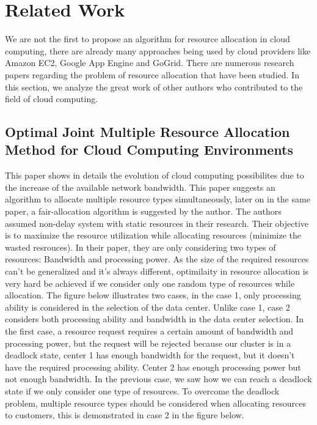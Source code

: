 \documentclass{article}
\begin{document}
\newpage
\section{Related Work}
We are not the ﬁrst to propose an algorithm for resource allocation in cloud computing, there are already many approaches being used by cloud providers like Amazon EC2, Google App Engine and GoGrid. There are numerous research papers regarding the problem of resource allocation that have been studied. In this section, we analyze the great work of other authors who contributed to the field of cloud computing.

\subsection{Optimal Joint Multiple Resource Allocation Method for Cloud Computing Environments}
This paper shows in details the evolution of cloud computing possibilites due to the increase of the available network bandwidth. This paper suggests an algorithm to allocate multiple resource types simultaneously, later on in the same paper, a fair-allocation algorithm is suggested by the author. The authors assumed non-delay system with static resources in their research. Their objective is to maximize the resource utilization while allocating resources (minimize the wasted resrouces). In their paper, they are only considering two types of resources: Bandwidth and processing power. As the size of the required resources can't be generalized and it's always different, optimilaity in resource allocation is very hard be achieved if we consider only one random type of resources while allocation. The figure below illustrates two cases, in the case 1, only processing ability is considered in the selection of the data center. Unlike case 1, case 2 considers both processing ability and bandwidth in the data center selection. In the first case, a resource request requires a certain amount of bandwidth and processing power, but the request will be rejected because our cluster is in a deadlock state, center 1 has enough bandwidth for the request, but it doesn't have the required processing ability. Center 2 has enough processing power but not enough bandwidth. In the previous case, we saw how we can reach a deadlock state if we only consider one type of resources. To overcome the deadlock problem, multiple resource types should be considered when allocating resources to customers, this is demonstrated in case 2 in the figure below. 
\end{document}
